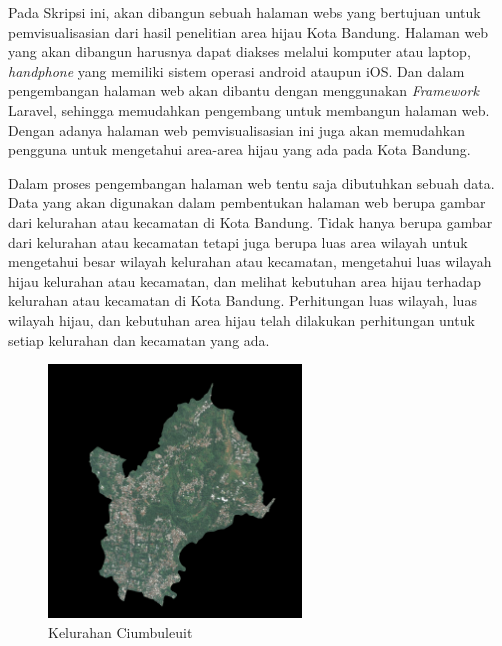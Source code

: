 Pada Skripsi ini, akan dibangun sebuah halaman webs yang bertujuan untuk pemvisualisasian dari hasil penelitian area hijau Kota Bandung\cite{juan:22:pengumpulan}. Halaman web yang akan dibangun harusnya dapat diakses melalui komputer atau laptop, \textit{handphone} yang memiliki sistem operasi android ataupun iOS. Dan dalam pengembangan halaman web akan dibantu dengan menggunakan \emph{Framework} Laravel, sehingga memudahkan pengembang untuk membangun halaman web. Dengan adanya halaman web pemvisualisasian ini juga akan memudahkan pengguna untuk mengetahui area-area hijau yang ada pada Kota Bandung.

Dalam proses pengembangan halaman web tentu saja dibutuhkan sebuah data. Data yang akan digunakan dalam pembentukan halaman web berupa gambar dari kelurahan atau kecamatan di Kota Bandung. Tidak hanya berupa gambar dari kelurahan atau kecamatan tetapi juga berupa luas area wilayah untuk mengetahui besar wilayah kelurahan atau kecamatan, mengetahui luas wilayah hijau kelurahan atau kecamatan, dan melihat kebutuhan area hijau terhadap kelurahan atau kecamatan di Kota Bandung. Perhitungan luas wilayah, luas wilayah hijau, dan kebutuhan area hijau telah dilakukan perhitungan untuk setiap kelurahan dan kecamatan yang ada. 

\begin{figure}[H]
	\centering
	\includegraphics[width=0.6\textwidth]{Gambar/Ciumbuleuit.png}
	\caption{Kelurahan Ciumbuleuit}
	\label{fig:ciumbuleuit}
\end{figure}


